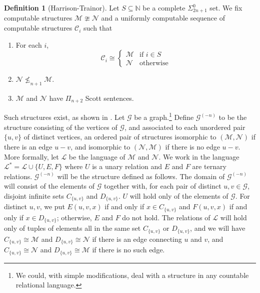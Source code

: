 \documentclass{article}
\newcommand{\Inv}[2]{{#2}^{(-#1)}}
\theoremstyle{definition}
\newtheorem{defn}[thm]{Definition}
\begin{document}
	\begin{defn}[Harrison-Trainor]
		Let $S \subseteq \mathbb{N}$ be a complete $\Sigma^0_{2n+1}$ set. We fix computable structures $\mathcal{M} \ncong \mathcal{N}$ and a uniformly computable sequence of computable structures $\mathcal{C}_i$ such that
		\begin{enumerate}
			\item For each $i$,
			\[\mathcal{C}_i\cong\left\{\begin{array}{cc} \mathcal{M} & \mbox{if $i\in S$}\\
				\mathcal{N} & \mbox{otherwise}
			\end{array}\right.\]
			\item $\mathcal{N} \nleq_{n+1} \mathcal{M}$.
			\item $\mathcal{M}$ and $\mathcal{N}$ have $\Pi_{n+2}$ Scott sentences.
		\end{enumerate}
		Such structures exist, as shown in \cite{unfriendly}.
		Let $\mathcal{G}$ be a graph.\footnote{We could, with simple modifications, deal with a structure in any countable relational language.} Define $\Inv{n}{\mathcal{G}}$ to be the structure consisting of the vertices of $\mathcal{G}$, and associated to each unordered pair $\{u,v\}$ of distinct vertices, an ordered pair of structures isomorphic to $(\mathcal{M},\mathcal{N})$ if there is an edge $u - v$, and isomorphic to $(\mathcal{N},\mathcal{M})$ if there is no edge $u - v$. More formally, let $\mathcal{L}$ be the language of $\mathcal{M}$ and $\mathcal{N}$. We work in the language $\mathcal{L}^* = \mathcal{L} \cup \{U,E,F\}$ where $U$ is a unary relation and $E$ and $F$ are ternary relations. $\Inv{n}{\mathcal{G}}$ will be the structure defined as follows. The domain of $\Inv{n}{\mathcal{G}}$ will consist of the elements of $\mathcal{G}$ together with, for each pair of distinct $u,v \in \mathcal{G}$, disjoint infinite sets $C_{\{u,v\}}$ and $D_{\{u,v\}}$. $U$ will hold only of the elements of $\mathcal{G}$. For distinct $u,v$, we put $E(u,v,x)$ if and only if $x \in C_{\{u,v\}}$ and $F(u,v,x)$ if and only if $x \in D_{\{u,v\}}$; otherwise, $E$ and $F$ do not hold. The relations of $\mathcal{L}$ will hold only of tuples of elements all in the same set $C_{\{u,v\}}$ or $D_{\{u,v\}}$, and we will have $C_{\{u,v\}} \cong \mathcal{M}$ and $D_{\{u,v\}} \cong \mathcal{N}$ if there is an edge connecting $u$ and $v$, and $C_{\{u,v\}} \cong \mathcal{N}$ and $D_{\{u,v\}} \cong \mathcal{M}$ if there is no such edge.
	\end{defn}
	
\end{document}
